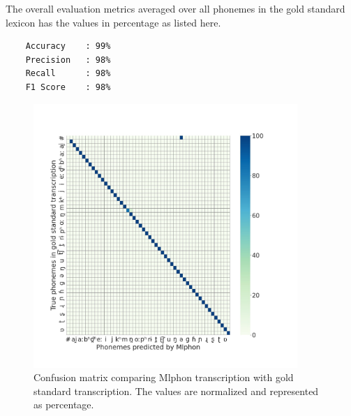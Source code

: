 \documentclass{ieeeaccess}
\begin{document}


The overall evaluation metrics averaged over all phonemes in the gold standard lexicon has the values in percentage as listed here.



\begin{lstlisting}
	Accuracy	: 99%
	Precision	: 98%
	Recall		: 98%
	F1 Score	: 98%
\end{lstlisting}


\begin{figure}[h]
	\centering
	\includegraphics [width=\linewidth, height=10cm]{confusion.jpg}
	\caption{Confusion matrix comparing Mlphon transcription with gold standard transcription. The values are normalized and represented as percentage.}
	\label{confusionmatrix}
\end{figure}
\end{document}
